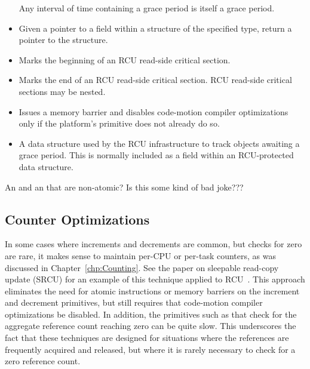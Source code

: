 \begin{itemize}
	Any interval of time containing a grace period is itself a
	grace period.
\item	{}
	Given a pointer  to a field  within a structure
	of the specified type, return a pointer to the structure.
\item	{}
	Marks the beginning of an RCU read-side critical section.
\item	{}
	Marks the end of an RCU read-side critical section.
	RCU read-side critical sections may be nested.
\item	{}
	Issues a memory barrier and disables code-motion compiler
	optimizations only if the platform's 
	primitive does not already do so.
\item	{}
	A data structure used by the RCU infrastructure to track
	objects awaiting a grace period.
	This is normally included as a field within an RCU-protected
	data structure.
\end{itemize}

\QuickQuiz{}
	An  and an  that are
	non-atomic?
	Is this some kind of bad joke???
 \QuickQuizEnd

\subsection{Counter Optimizations}
\label{sec:defer:Counter Optimizations}

In some cases where increments and decrements are common, but checks
for zero are rare, it makes sense to maintain per-CPU or per-task
counters, as was discussed in Chapter~\ref{chp:Counting}.
See the paper on sleepable read-copy update
(SRCU) for an example of this technique applied to
RCU~\cite{PaulEMcKenney2006c}.
This approach eliminates the need for atomic instructions or memory
barriers on the increment and decrement primitives, but still requires
that code-motion compiler optimizations be disabled.
In addition, the primitives such as 
that check for the aggregate reference
count reaching zero can be quite slow.
This underscores the fact that these techniques are designed
for situations where the references are frequently acquired and
released, but where it is rarely necessary to check for a zero
reference count.

